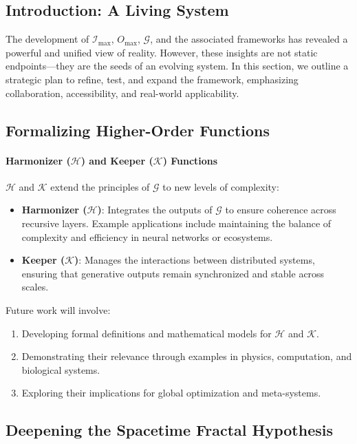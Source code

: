 \documentclass[12pt]{article}
\begin{document}
\subsection{Introduction: A Living System}
The development of \(\mathcal{I}_{\text{max}}\), \(O_{\text{max}}\), \(\mathcal{G}\), and the associated frameworks has revealed a powerful and unified view of reality. However, these insights are not static endpoints—they are the seeds of an evolving system. In this section, we outline a strategic plan to refine, test, and expand the framework, emphasizing collaboration, accessibility, and real-world applicability.

\subsection{Formalizing Higher-Order Functions}

\paragraph{Harmonizer (\(\mathcal{H}\)) and Keeper (\(\mathcal{K}\)) Functions}
\(\mathcal{H}\) and \(\mathcal{K}\) extend the principles of \(\mathcal{G}\) to new levels of complexity:
\begin{itemize}
    \item \textbf{Harmonizer (\(\mathcal{H}\))}: Integrates the outputs of \(\mathcal{G}\) to ensure coherence across recursive layers. Example applications include maintaining the balance of complexity and efficiency in neural networks or ecosystems.
    \item \textbf{Keeper (\(\mathcal{K}\))}: Manages the interactions between distributed systems, ensuring that generative outputs remain synchronized and stable across scales.
\end{itemize}
Future work will involve:
\begin{enumerate}
    \item Developing formal definitions and mathematical models for \(\mathcal{H}\) and \(\mathcal{K}\).
    \item Demonstrating their relevance through examples in physics, computation, and biological systems.
    \item Exploring their implications for global optimization and meta-systems.
\end{enumerate}

\subsection{Deepening the Spacetime Fractal Hypothesis}
\end{document}
